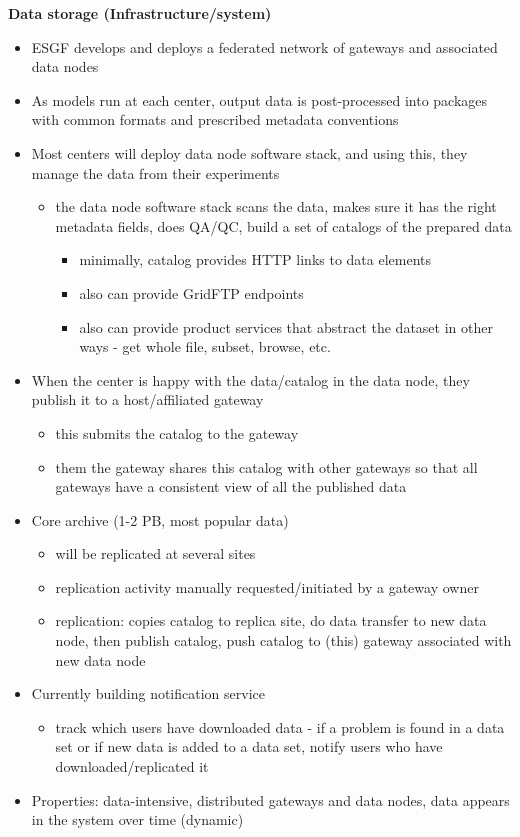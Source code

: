 \documentclass[preprint,12pt]{article}
\begin{document}
{\bf Data storage (Infrastructure/system)}

\begin{itemize}
\item ESGF develops and deploys a federated network of gateways and associated data nodes
\item As models run at each center, output data is post-processed into packages with common formats and prescribed metadata conventions
\item Most centers will deploy data node software stack, and using this, they manage the data from their experiments
  \begin{itemize}
  \item the data node software stack scans the data, makes sure it has the right metadata fields, does QA/QC, build a set of catalogs of the prepared data
  \begin{itemize}
                \item minimally, catalog provides HTTP links to data elements
                \item also can provide GridFTP endpoints
                \item also can provide product services that abstract the dataset in other ways - get whole file, subset, browse, etc.
  \end{itemize}
  \end{itemize}
    \item When the center is happy with the data/catalog in the data node, they publish it to a host/affiliated gateway
\begin{itemize}
         \item  this submits the catalog to the gateway
          \item  them the gateway shares this catalog with other gateways so that all gateways have a consistent view of all the published data
\end{itemize}
    \item  Core archive (1-2 PB, most popular data)
\begin{itemize}
          \item  will be replicated at several sites
         \item  replication activity manually requested/initiated by a gateway owner
          \item  replication: copies catalog to replica site, do data transfer to new data node, then publish  catalog, push catalog to (this) gateway associated with new data node
\end{itemize}
    \item  Currently building notification service
\begin{itemize}
          \item  track which users have downloaded data - if a problem is found in a data set or if new data is added to a data set, notify users who have downloaded/replicated it
\end{itemize}
    \item  Properties: data-intensive, distributed gateways and data nodes, data appears in the system over time (dynamic)
\end{itemize}
\end{document}
